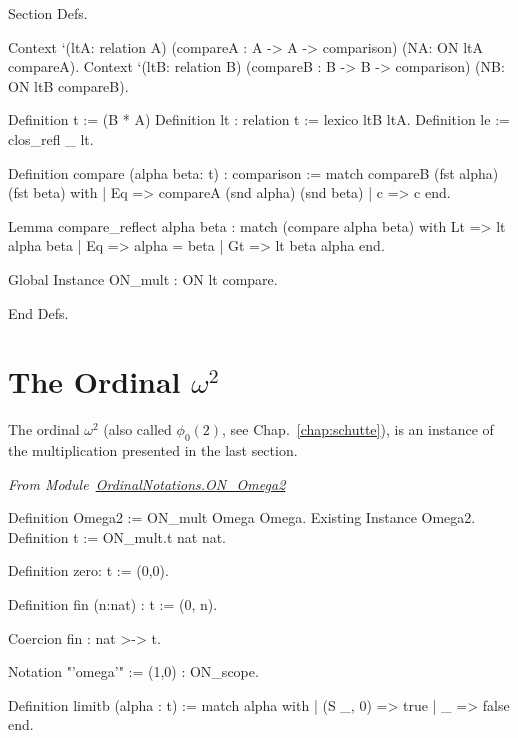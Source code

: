 \begin{Coqsrc}
Section Defs.

  Context `(ltA: relation A)
          (compareA : A -> A -> comparison)
          (NA: ON ltA compareA).
  Context `(ltB: relation B)
          (compareB : B -> B -> comparison)
          (NB: ON ltB compareB).

Definition t := (B * A)%
Definition lt : relation t := lexico ltB ltA.
Definition le := clos_refl _ lt.

Definition compare (alpha beta: t) : comparison :=
  match compareB (fst alpha) (fst beta) with
  |  Eq => compareA (snd alpha) (snd beta)
  | c => c
  end.

Lemma compare_reflect alpha beta :
  match (compare alpha beta)
  with
    Lt => lt alpha  beta
  | Eq => alpha = beta
  | Gt => lt beta  alpha
  end.

Global Instance ON_mult : ON lt compare.

End Defs.
\end{Coqsrc}

\section{The Ordinal \texorpdfstring{$\omega^2$}{omega^2}}

The ordinal $\omega^2$ (also called $\phi_0(2)$, see Chap.~\ref{chap:schutte}), is an instance of the multiplication presented in the last section.

\vspace{4pt}
\noindent\emph{From Module~\href{../theories/html/hydras.OrdinalNotations.ON_Omega2.html}{OrdinalNotations.ON\_Omega2}}

\begin{Coqsrc}
Definition Omega2 := ON_mult Omega Omega.
Existing Instance Omega2.
Definition t := ON_mult.t nat nat.
\end{Coqsrc}



\begin{Coqsrc}
Definition zero: t := (0,0).

Definition fin (n:nat) : t := (0, n).

Coercion fin : nat >-> t.

Notation "'omega'" := (1,0) : ON_scope.

Definition limitb (alpha : t) := 
 match alpha with
 |  (S _, 0) => true
 | _ => false
end.
\end{Coqsrc}




